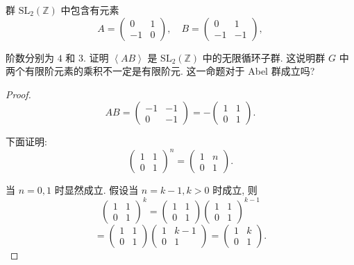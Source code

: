 \documentclass{ctexart}
\begin{document}
\begin{exercise}[2.7]
    群 $\mathrm{SL}_2(\mathbb{Z})$ 中包含有元素
    \[A=\begin{pmatrix}
        0 & 1 \\
        -1 & 0
    \end{pmatrix},\quad B=\begin{pmatrix}
        0 & 1 \\
        -1 & -1
    \end{pmatrix},\]

    阶数分别为 $4$ 和 $3$. 证明 $\left<AB\right>$ 是 $\mathrm{SL}_2(\mathbb{Z})$ 中的无限循环子群. 这说明群 $G$ 中两个有限阶元素的乘积不一定是有限阶元. 这一命题对于 Abel 群成立吗?
\end{exercise}
\begin{proof}
    \[AB=\begin{pmatrix}
        -1 & -1 \\
        0 & -1
    \end{pmatrix}=-\begin{pmatrix}
        1 & 1 \\
        0 & 1
    \end{pmatrix}.\]
    
    下面证明:
    \[\begin{pmatrix}
        1 & 1 \\
        0 & 1
    \end{pmatrix}^n=\begin{pmatrix}
        1 & n \\
        0 & 1
    \end{pmatrix}.\]
    
    当 $n=0,1$ 时显然成立. 假设当 $n=k-1,k>0$ 时成立, 则
    \[\begin{pmatrix}
        1 & 1 \\
        0 & 1
    \end{pmatrix}^k=\begin{pmatrix}
        1 & 1 \\
        0 & 1
    \end{pmatrix}\begin{pmatrix}
        1 & 1 \\
        0 & 1
    \end{pmatrix}^{k-1}\]
    \[=\begin{pmatrix}
        1 & 1 \\
        0 & 1
    \end{pmatrix}\begin{pmatrix}
        1 & k-1 \\
        0 & 1
    \end{pmatrix}=\begin{pmatrix}
        1 & k \\
        0 & 1
    \end{pmatrix}.\]
    

\end{proof}
\end{document}
